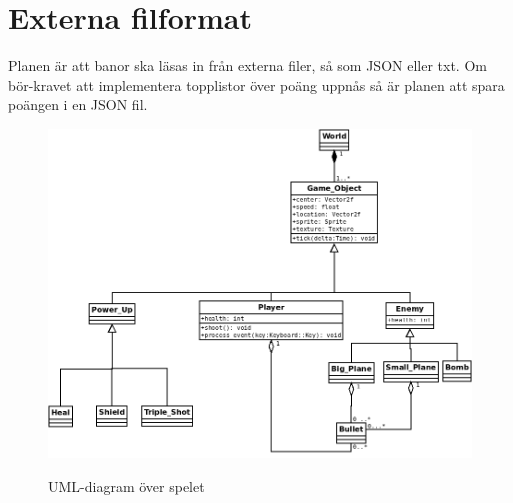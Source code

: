 \documentclass{TDP003mall}
\begin{document}
\section{Externa filformat} 
Planen är att banor ska läsas in från externa filer, så som JSON eller txt. Om bör-kravet att implementera topplistor över poäng uppnås så är planen att spara poängen i en JSON fil.
\begin{figure}[h!]
\centering
\includegraphics[scale=0.5]{UML_diagram.png}
\label{}
\caption{UML-diagram över spelet}
\end{figure}
\end{document}
